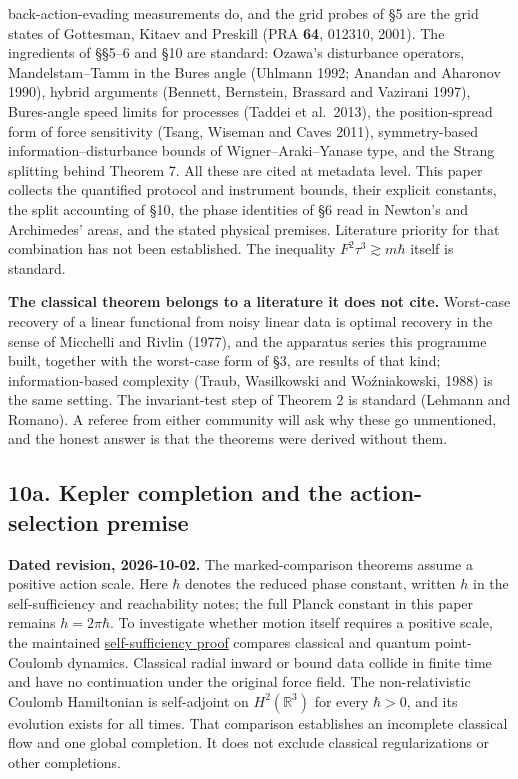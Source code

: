 \documentclass[11pt,a4paper]{article}
\begin{document}
back-action-evading measurements do, and the grid probes of §5 are the
grid states of Gottesman, Kitaev and Preskill (PRA \textbf{64}, 012310,
2001). The ingredients of §§5--6 and §10 are standard: Ozawa's
disturbance operators, Mandelstam--Tamm in the Bures angle (Uhlmann
1992; Anandan and Aharonov 1990), hybrid arguments (Bennett, Bernstein,
Brassard and Vazirani 1997), Bures-angle speed limits for processes
(Taddei et al.~2013), the position-spread form of force sensitivity
(Tsang, Wiseman and Caves 2011), symmetry-based information--disturbance
bounds of Wigner--Araki--Yanase type, and the Strang splitting behind
Theorem 7. All these are cited at metadata level. This paper collects
the quantified protocol and instrument bounds, their explicit constants,
the split accounting of §10, the phase identities of §6 read in Newton's
and Archimedes' areas, and the stated physical premises. Literature
priority for that combination has not been established. The inequality
\(F^2\tau^3\gtrsim m\hbar\) itself is standard.

\textbf{The classical theorem belongs to a literature it does not cite.}
Worst-case recovery of a linear functional from noisy linear data is
optimal recovery in the sense of Micchelli and Rivlin (1977), and the
apparatus series this programme built, together with the worst-case form
of §3, are results of that kind; information-based complexity (Traub,
Wasilkowski and Woźniakowski, 1988) is the same setting. The
invariant-test step of Theorem 2 is standard (Lehmann and Romano). A
referee from either community will ask why these go unmentioned, and the
honest answer is that the theorems were derived without them.

\hypertarget{a.-kepler-completion-and-the-action-selection-premise}{%
\subsection{10a. Kepler completion and the action-selection
premise}\label{a.-kepler-completion-and-the-action-selection-premise}}

\textbf{Dated revision, 2026-10-02.} The marked-comparison theorems
assume a positive action scale. Here \(\hbar\) denotes the reduced phase
constant, written \(h\) in the self-sufficiency and reachability notes;
the full Planck constant in this paper remains \(h=2\pi\hbar\). To
investigate whether motion itself requires a positive scale, the
maintained \href{self-sufficiency-contrast.md}{self-sufficiency proof}
compares classical and quantum point-Coulomb dynamics. Classical radial
inward or bound data collide in finite time and have no continuation
under the original force field. The non-relativistic Coulomb Hamiltonian
is self-adjoint on \(H^2(\mathbb R^3)\) for every \(\hbar>0\), and its
evolution exists for all times. That comparison establishes an
incomplete classical flow and one global completion. It does not exclude
classical regularizations or other completions.
\end{document}
